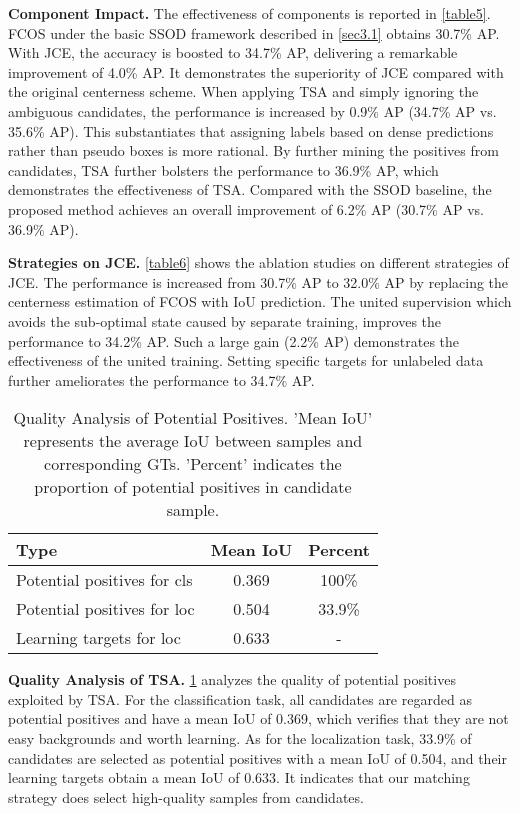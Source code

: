 \documentclass[10pt,twocolumn,letterpaper]{article}
\begin{document}
\noindent\textbf{Component Impact.}
The effectiveness of components is reported in \cref{table5}.
FCOS under the basic SSOD framework described in \cref{sec3.1} obtains 30.7\% AP.
With JCE, the accuracy is boosted to 34.7\% AP, delivering a remarkable improvement of 4.0\% AP.
It demonstrates the superiority of JCE compared with the original centerness scheme.
When applying TSA and simply ignoring the ambiguous candidates, the performance is increased by 0.9\% AP (34.7\% AP vs. 35.6\% AP).
This substantiates that assigning labels based on dense predictions rather than pseudo boxes is more rational.
By further mining the positives from candidates, TSA further bolsters the performance to 36.9\% AP, which demonstrates the effectiveness of TSA.
Compared with the SSOD baseline, the proposed method achieves an overall improvement of 6.2\% AP (30.7\% AP vs. 36.9\% AP).

\noindent\textbf{Strategies on JCE.}
\cref{table6} shows the ablation studies on different strategies of JCE. 
The performance is increased from 30.7\% AP to 32.0\% AP by replacing the centerness estimation of FCOS with IoU prediction.
The united supervision which avoids the sub-optimal state caused by separate training, improves the performance to 34.2\% AP.
Such a large gain (2.2\% AP) demonstrates the effectiveness of the united training.
Setting specific targets for unlabeled data further ameliorates the performance to 34.7\% AP.



\begin{table}[t]
\caption{Quality Analysis of Potential Positives. 'Mean IoU' represents the average IoU between samples and corresponding GTs. 'Percent' indicates the proportion of potential positives in candidate sample.}
    \centering
    \begin{tabular}{lcc}
    \hline
    Type & Mean IoU & Percent\\
    \hline
    Potential positives for cls & 0.369 & 100\% \\
    Potential positives for loc & 0.504 & 33.9\% \\
    Learning targets for loc    & 0.633 & -  \\
    \hline
    \end{tabular}
    \label{table7}
\end{table}

\noindent\textbf{Quality Analysis of TSA.}
\cref{table7} analyzes the quality of potential positives exploited by TSA.
For the classification task, all candidates are regarded as potential positives and have a mean IoU of 0.369, which verifies that they are not easy backgrounds and worth learning.
As for the localization task, 33.9\% of candidates are selected as potential positives with a mean IoU of 0.504, and their learning targets obtain a mean IoU of 0.633. 
It indicates that our matching strategy does select high-quality samples from candidates.
\end{document}
